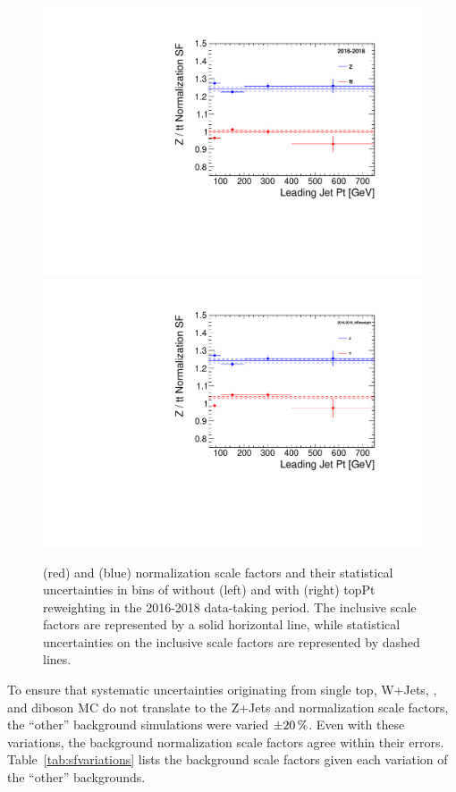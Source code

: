 \begin{figure}[H]
    \centering
    {\includegraphics[width=.4\textwidth]{Images/Analysis/SFStudy/mumuScaleFactors_jetPt.pdf}}
    {\includegraphics[width=.4\textwidth]{Images/Analysis/SFStudy/mumuScaleFactors_jetPt_topPt.pdf}}
    \caption{\ZJETS (red) and \ttbar (blue) normalization scale factors and their statistical uncertainties in bins of \ptof{\jetOne} without (left) and with (right) topPt reweighting in the 2016-2018 data-taking period. The inclusive scale factors are represented by a solid horizontal line, while statistical uncertainties on the inclusive scale factors are represented by dashed lines.}
    \label{figapp:sfstudy_jetPt}
\end{figure}

To ensure that systematic uncertainties originating from single top, W+Jets, \TTV, and diboson MC do not translate to the Z+Jets and \ttbar normalization scale factors, the ``other'' background simulations were varied $\SI{\pm20}{\%}$. Even with these variations, the background normalization scale factors agree within their errors. Table~\ref{tab:sfvariations} lists the background scale factors given each variation of the ``other'' backgrounds.

